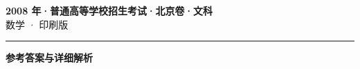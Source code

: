 \documentclass[zihao=5, a4paper]{ctexart}
\begin{document}
\begin{center}
  {\Large\bfseries 2008 年·普通高等学校招生考试·北京卷·文科}\\[4pt]
  {\large 数学 · 印刷版}
\end{center}
\medskip
{}

\par\bigskip\hrule\bigskip
{}
\begin{center}{\large\bfseries 参考答案与详细解析}\end{center}
\smallskip

\end{document}
